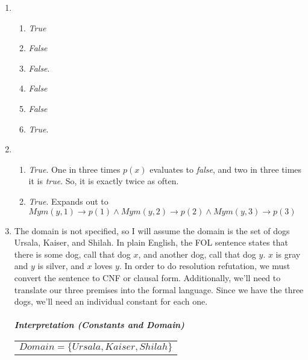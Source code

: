 \documentclass{article}
\begin{document}
\begin{enumerate}
    \item %
    \begin{enumerate}
        \item \textit{True}
        \item \textit{False}
        \item \textit{False}. %
        \item \textit{False}
        \item \textit{False}
        \item \textit{True}.%
    \end{enumerate}
    \item
    \begin{enumerate}
        \item \textit{True}. One in three times $p(x)$ evaluates to \textit{false}, and two in three times it is \textit{true}. So, it is exactly twice as often.
        \item \textit{True}. Expands out to $My m(y,1) \rightarrow p(1) \wedge My m(y,2) \rightarrow p(2) \wedge My m(y,3) \rightarrow p(3)$
    \end{enumerate}
    \pagebreak
    \item %
    The domain is not specified, so I will assume the domain is the set of dogs Ursala, Kaiser, and Shilah. In plain English, the FOL sentence states that there is some dog, call that dog $x$, and another dog, call that dog $y$. $x$ is gray and $y$ is silver, and $x$ loves $y$. In order to do resolution refutation, we must convert the sentence to CNF or clausal form. Additionally, we'll need to translate our three premises into the formal language. Since we have the three dogs, we'll need an individual constant for each one.\\\\
    \textit{\textbf{Interpretation (Constants and Domain)}}\\
    \begin{tabular}{l}
        $Domain = \{Ursala, Kaiser, Shilah\}$\\

\end{tabular}
\end{enumerate}
\end{document}

